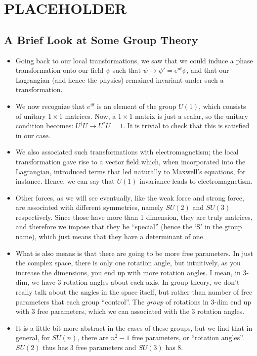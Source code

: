 \section{PLACEHOLDER}
\subsection*{A Brief Look at Some Group Theory}

\begin{itemize}
    \item Going back to our local transformations, we saw that we could induce a phase transformation onto our field $\psi$ such that $\psi \rightarrow \psi' = e^{i\theta}\psi$, and that our Lagrangian (and hence the physics) remained invariant under such a transformation.
    \item We now recognize that $e^{i\theta}$ is an element of the group $U(1)$, which consists of unitary $1\times1$ matrices. Now, a $1\times1$ matrix is just a scalar, so the unitary condition becomes: $U^{\dagger}U \rightarrow U^*U = 1$. It is trivial to check that this is satisfied in our case.
    \item We also associated such transformations with electromagnetism; the local transformation gave rise to a vector field which, when incorporated into the Lagrangian, introduced terms that led naturally to Maxwell's equations, for instance. Hence, we can say that $U(1)$ invariance leads to electromagnetism.
    \item Other forces, as we will see eventually, like the weak force and strong force, are associated with different symmetries, namely $SU(2)$ and $SU(3)$ respectively. Since those have more than 1 dimension, they are truly matrices, and therefore we impose that they be ``special'' (hence the `S' in the group name), which just means that they have a determinant of one.
    \item What is also means is that there are going to be more free parameters. In just the complex space, there is only one rotation angle, but intuitively, as you increase the dimensions, you end up with more rotation angles. I mean, in 3-dim, we have 3 rotation angles about each axis. In group theory, we don't really talk about the angles in the space itself, but rather than number of free parameters that each group ``control''. The \textit{group} of rotations in 3-dim end up with 3 free parameters, which we can associated with the 3 rotation angles.
    \item It is a little bit more abstract in the cases of these groups, but we find that in general, for $SU(n)$, there are $n^2-1$ free parameters, or ``rotation angles''. $SU(2)$ thus has 3 free parameters and $SU(3)$ has 8.

\end{itemize}
